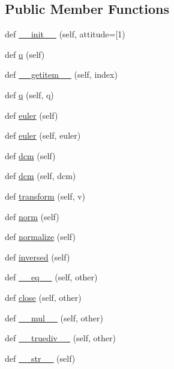 \subsection*{Public Member Functions}
\begin{DoxyCompactItemize}
\item 
def \hyperlink{classpymavlink_1_1quaternion_1_1QuaternionBase_a8ef1117bc967a2d373e742db89295a3b}{\+\_\+\+\_\+init\+\_\+\+\_\+} (self, attitude=\mbox{[}1)
\item 
def \hyperlink{classpymavlink_1_1quaternion_1_1QuaternionBase_a5afdd0b6ec9069e6f0e0bf2032cf9fe6}{q} (self)
\item 
def \hyperlink{classpymavlink_1_1quaternion_1_1QuaternionBase_a2877818e54a5c9bc1a39caf4ce0fddf5}{\+\_\+\+\_\+getitem\+\_\+\+\_\+} (self, index)
\item 
def \hyperlink{classpymavlink_1_1quaternion_1_1QuaternionBase_adf7daed709c0f21d0225039830450543}{q} (self, q)
\item 
def \hyperlink{classpymavlink_1_1quaternion_1_1QuaternionBase_a05ce9891b63e3b83fc52521581ddba5e}{euler} (self)
\item 
def \hyperlink{classpymavlink_1_1quaternion_1_1QuaternionBase_a3bc9e70528ac1880ec02a69c9fe86c26}{euler} (self, euler)
\item 
def \hyperlink{classpymavlink_1_1quaternion_1_1QuaternionBase_a534fc3e09f0c3b65e8fe5105d39e4891}{dcm} (self)
\item 
def \hyperlink{classpymavlink_1_1quaternion_1_1QuaternionBase_a2da4adc7fb783fe3d4e3c4d92f3ac91e}{dcm} (self, dcm)
\item 
def \hyperlink{classpymavlink_1_1quaternion_1_1QuaternionBase_a747068d71180696e5131e2ca31c2a13c}{transform} (self, v)
\item 
def \hyperlink{classpymavlink_1_1quaternion_1_1QuaternionBase_a9b204e22c7e9e0625a84ef16d8b87755}{norm} (self)
\item 
def \hyperlink{classpymavlink_1_1quaternion_1_1QuaternionBase_aec2e9571fc65fcda925d8be556ce949b}{normalize} (self)
\item 
def \hyperlink{classpymavlink_1_1quaternion_1_1QuaternionBase_a6d4db8c4ecf5f04d0ebaf798d17605cf}{inversed} (self)
\item 
def \hyperlink{classpymavlink_1_1quaternion_1_1QuaternionBase_acf052c96499b7df3c5d535e7e6615197}{\+\_\+\+\_\+eq\+\_\+\+\_\+} (self, other)
\item 
def \hyperlink{classpymavlink_1_1quaternion_1_1QuaternionBase_ae368fa4a7df294b50db40a17d20c0908}{close} (self, other)
\item 
def \hyperlink{classpymavlink_1_1quaternion_1_1QuaternionBase_a694593af9f5007fc418b1473c3b32496}{\+\_\+\+\_\+mul\+\_\+\+\_\+} (self, other)
\item 
def \hyperlink{classpymavlink_1_1quaternion_1_1QuaternionBase_acdb6fa13b26fc10c02eb40ee51de6899}{\+\_\+\+\_\+truediv\+\_\+\+\_\+} (self, other)
\item 
def \hyperlink{classpymavlink_1_1quaternion_1_1QuaternionBase_a2c8b45efc655d4220042a132c4255f01}{\+\_\+\+\_\+str\+\_\+\+\_\+} (self)
\end{DoxyCompactItemize}

